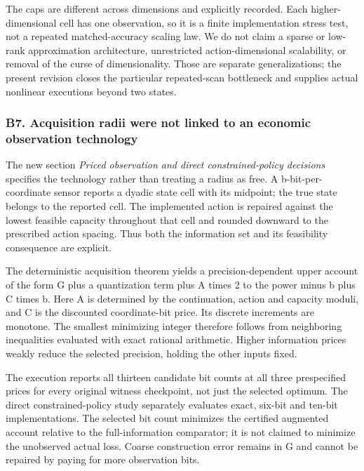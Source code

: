 \documentclass[ecta,nameyear,draft]{econsocart}
\begin{document}
The caps are different across dimensions and explicitly recorded. Each
higher-dimensional cell has one observation, so it is a finite
implementation stress test, not a repeated matched-accuracy scaling law.
We do not claim a sparse or low-rank approximation architecture,
unrestricted action-dimensional scalability, or removal of the curse of
dimensionality. Those are separate generalizations; the present revision
closes the particular repeated-scan bottleneck and supplies actual
nonlinear executions beyond two states.

\hypertarget{b7-acquisition-radii-were-not-linked-to-an-economic-observation-technology}{%
\subsubsection{B7. Acquisition radii were not linked to an economic
observation
technology}\label{b7-acquisition-radii-were-not-linked-to-an-economic-observation-technology}}

The new section \emph{Priced observation and direct constrained-policy
decisions} specifies the technology rather than treating a radius as
free. A b-bit-per-coordinate sensor reports a dyadic state cell with its
midpoint; the true state belongs to the reported cell. The implemented
action is repaired against the lowest feasible capacity throughout that
cell and rounded downward to the prescribed action spacing. Thus both
the information set and its feasibility consequence are explicit.

The deterministic acquisition theorem yields a precision-dependent upper
account of the form G plus a quantization term plus A times 2 to the
power minus b plus C times b. Here A is determined by the continuation,
action and capacity moduli, and C is the discounted coordinate-bit
price. Its discrete increments are monotone. The smallest minimizing
integer therefore follows from neighboring inequalities evaluated with
exact rational arithmetic. Higher information prices weakly reduce the
selected precision, holding the other inputs fixed.

The execution reports all thirteen candidate bit counts at all three
prespecified prices for every original witness checkpoint, not just the
selected optimum. The direct constrained-policy study separately
evaluates exact, six-bit and ten-bit implementations. The selected bit
count minimizes the certified augmented account relative to the
full-information comparator; it is not claimed to minimize the
unobserved actual loss. Coarse construction error remains in G and
cannot be repaired by paying for more observation bits.
\end{document}
